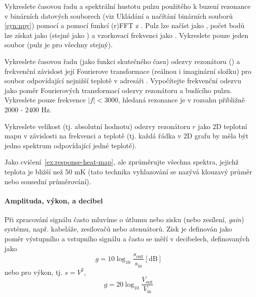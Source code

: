 \begin{exercise}
    Vykreslete časovou řadu a spektrální hustotu pulzu použitého k buzení rezonance v binárních datových souborech  (viz Ukládání a načítání binárních souborů \ref{syn:npy}) pomocí  a pomocí funkcí (r)FFT z . Pulz lze načíst jako , počet bodů lze získat jako  (stejné jako ) a vzorkovací frekvenci jako . Vykreslete pouze jeden soubor (pulz je pro všechny stejný).
\end{exercise}

\begin{exercise}
    Vykreslete časovou řadu (jako funkci skutečného času) odezvy rezonátoru () a frekvenční závislost její Fourierove transformace (reálnou i imaginární složku) pro soubor odpovídající nejnižší teplotě v adresáři . Vypočítejte frekvenční odezvu jako poměr Fourierových transformací odezvy rezonátoru a budícího pulzu. Vykreslete pouze frekvence $|f| < 3000$, hledaná rezonance je v rozsahu přibližně 2000 - 2400 Hz.
\end{exercise}

\begin{exercise}
    \label{ex:response-heat-map}
    Vykreslete velikost (tj. absolutní hodnotu) odezvy rezonátoru $r$ jako 2D teplotní mapu v závislosti na frekvenci a teplotě (tj. každá řádka v 2D grafu by měla být jedno spektrum odpovídající jedné teplotě).
\end{exercise}

\begin{exercise}
    Jako cvičení~\ref{ex:response-heat-map}, ale zprůměrujte všechna spektra, jejichž teplota je bližší než 50 mK (tato technika vyhlazování se nazývá klouzavý průměr nebo sousední průměrování).
\end{exercise}

\paragraph{Amplituda, výkon, a decibel}

Při zpracování signálu často mluvíme o útlumu nebo zisku (nebo zesílení, \emph{gain}) systému, např. kabeláže, zesilovačů nebo atenuátorů. Zisk je definován jako poměr výstupního a vstupního signálu a často se měří v decibelech, definovaných jako
\begin{equation}
    g = 10\log_{10}\frac{s_\mathrm{out}}{s_\mathrm{in}} \mathrm{[dB]}
\end{equation}
nebo pro výkon, tj. $s = V^2$,
\begin{equation}
    g = 20\log_{10}\frac{V_\mathrm{out}}{V_\mathrm{in}}
\end{equation}


